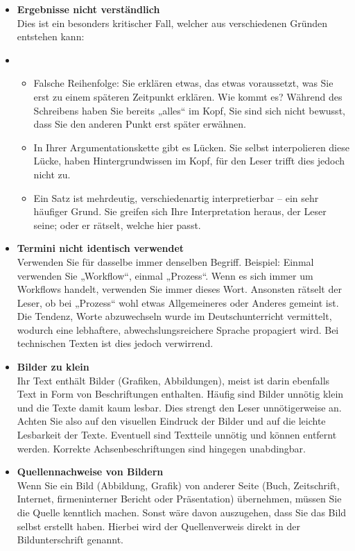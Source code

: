 \begin{itemize}
\item \textbf{Ergebnisse nicht verständlich} \\
Dies ist ein besonders kritischer Fall, welcher aus verschiedenen Gründen entstehen kann:
\item[]\begin{itemize}
\item Falsche Reihenfolge: Sie erklären etwas, das etwas voraussetzt, was Sie erst zu einem späteren Zeitpunkt erklären. Wie kommt es? Während des Schreibens haben Sie bereits „alles“ im Kopf, Sie sind sich nicht bewusst, dass Sie den anderen Punkt erst später erwähnen.
\item In Ihrer Argumentationskette gibt es Lücken. Sie selbst interpolieren diese Lücke, haben Hintergrundwissen im Kopf, für den Leser trifft dies jedoch nicht zu.
\item Ein Satz ist mehrdeutig, verschiedenartig interpretierbar – ein sehr häufiger Grund. Sie greifen sich Ihre Interpretation heraus, der Leser seine; oder er rätselt, welche hier passt.
\end{itemize}

\item	\textbf{Termini nicht identisch verwendet}\\
Verwenden Sie für dasselbe immer denselben Begriff. Beispiel:
Einmal verwenden Sie „Workflow“, einmal „Prozess“. Wenn es sich immer um Workflows handelt, verwenden Sie immer dieses Wort. Ansonsten rätselt der Leser, ob bei „Prozess“ wohl etwas Allgemeineres oder Anderes gemeint ist. Die Tendenz, Worte abzuwechseln wurde im Deutschunterricht vermittelt, wodurch eine lebhaftere, abwechslungsreichere Sprache propagiert wird. Bei technischen Texten ist dies jedoch verwirrend.

\item	\textbf{Bilder zu klein} \\
Ihr Text enthält Bilder (Grafiken, Abbildungen), meist ist darin ebenfalls Text in Form von Beschriftungen enthalten. Häufig sind Bilder unnötig klein und die Texte damit kaum lesbar. Dies strengt den Leser unnötigerweise an. Achten Sie also auf den visuellen Eindruck der Bilder und auf die leichte Lesbarkeit der Texte. Eventuell sind Textteile unnötig und können entfernt werden. Korrekte Achsenbeschriftungen sind hingegen unabdingbar.

\item	\textbf{Quellennachweise von Bildern} \\
Wenn Sie ein Bild (Abbildung, Grafik) von anderer Seite (Buch, Zeitschrift, Internet, firmeninterner Bericht oder Präsentation) übernehmen, müssen Sie die Quelle kenntlich machen. Sonst wäre davon auszugehen, dass Sie das Bild selbst erstellt haben. Hierbei wird der Quellenverweis direkt in der Bildunterschrift genannt. 


\end{itemize}
